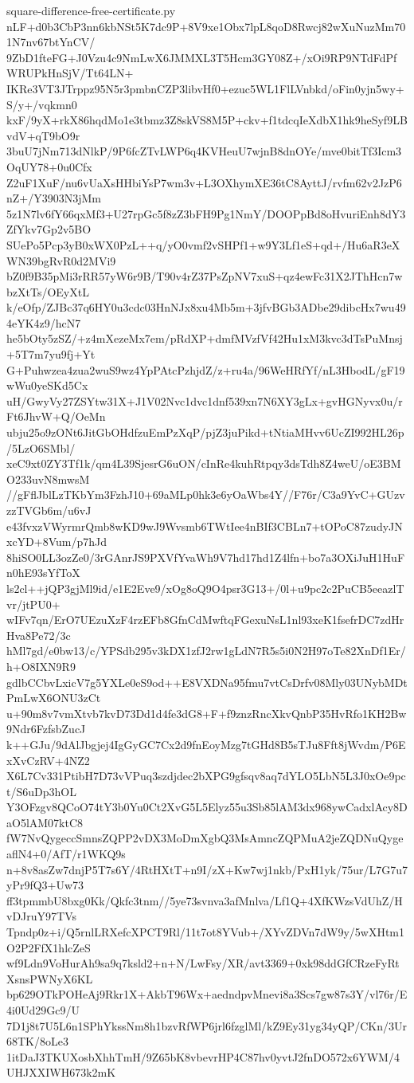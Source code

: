 \documentclass[11pt]{article}
\theoremstyle{definition}
\theoremstyle{remark}
\begin{document}
\begin{filecontents*}[overwrite]{square-difference-free-certificate.py}
nLF+d0b3CbP3nn6kbNSt5K7dc9P+8V9xe1Obx7lpL8qoD8Rwcj82wXuNuzMm701N7nv67btYnCV/
9ZbD1fteFG+J0Vzu4c9NmLwX6JMMXL3T5Hcm3GY08Z+/xOi9RP9NTdFdPfWRUPkHnSjV/Tt64LN+
IKRe3VT3JTrppz95N5r3pmbnCZP3libvHf0+ezuc5WL1FlLVnbkd/oFin0yjn5wy+S/y+/vqkmn0
kxF/9yX+rkX86hqdMo1e3tbmz3Z8skVS8M5P+ckv+f1tdcqIeXdbX1hk9heSyf9LBvdV+qT9bO9r
3buU7jNm713dNlkP/9P6fcZTvLWP6q4KVHeuU7wjnB8dnOYe/mve0bitTf3Icm3OqUY78+0u0Cfx
Z2uF1XuF/nu6vUaXsHHbiYsP7wm3v+L3OXhymXE36tC8AyttJ/rvfm62v2JzP6nZ+/Y3903N3jMm
5z1N7lv6fY66qxMf3+U27rpGc5f8zZ3bFH9Pg1NmY/DOOPpBd8oHvuriEnh8dY3ZfYkv7Gp2v5BO
SUePo5Pcp3yB0xWX0PzL++q/yO0vmf2vSHPf1+w9Y3Lf1eS+qd+/Hu6aR3eXWN39bgRvR0d2MVi9
bZ0f9B35pMi3rRR57yW6r9B/T90v4rZ37PsZpNV7xuS+qz4ewFc31X2JThHcn7wbzXtTs/OEyXtL
k/eOfp/ZJBc37q6HY0u3cdc03HnNJx8xu4Mb5m+3jfvBGb3ADbe29dibcHx7wu494eYK4z9/hcN7
he5bOty5zSZ/+z4mXezeMx7em/pRdXP+dmfMVzfVf42Hu1xM3kvc3dTsPuMnsj+5T7m7yu9fj+Yt
G+Puhwzea4zua2wuS9wz4YpPAtcPzhjdZ/z+ru4a/96WeHRfYf/nL3HbodL/gF19wWu0yeSKd5Cx
uH/GwyVy27ZSYtw31X+J1V02Nvc1dvc1dnf539xn7N6XY3gLx+gvHGNyvx0u/rFt6JhvW+Q/OeMn
ubju25o9zONt6JitGbOHdfzuEmPzXqP/pjZ3juPikd+tNtiaMHvv6UcZI992HL26p/5LzO6SMbl/
xeC9xt0ZY3Tf1k/qm4L39SjesrG6uON/cInRe4kuhRtpqy3dsTdh8Z4weU/oE3BMO233uvN8mwsM
//gFflJblLzTKbYm3FzhJ10+69aMLp0hk3e6yOaWbs4Y//F76r/C3a9YvC+GUzvzzTVGb6m/u6vJ
e43fvxzVWyrmrQmb8wKD9wJ9Wvsmb6TWtIee4nBIf3CBLn7+tOPoC87zudyJNxcYD+8Vum/p7hJd
8hiSO0LL3ozZe0/3rGAnrJS9PXVfYvaWh9V7hd17hd1Z4lfn+bo7a3OXiJuH1HuFn0hE93sYfToX
ls2cl++jQP3gjMl9id/e1E2Eve9/xOg8oQ9O4psr3G13+/0l+u9pc2c2PuCB5eeazlTvr/jtPU0+
wIFv7qn/ErO7UEzuXzF4rzEFb8GfnCdMwftqFGexuNsL1nl93xeK1fsefrDC7zdHrHva8Pe72/3c
hMl7gd/e0bw13/c/YPSdb295v3kDX1zfJ2rw1gLdN7R5s5i0N2H97oTe82XnDf1Er/h+O8IXN9R9
gdlbCCbvLxicV7g5YXLe0eS9od++E8VXDNa95fmu7vtCsDrfv08Mly03UNybMDtPmLwX6ONU3zCt
u+90m8v7vmXtvb7kvD73Dd1d4fe3dG8+F+f9znzRncXkvQnbP35HvRfo1KH2Bw9Ndr6FzfsbZucJ
k++GJu/9dAlJbgjej4IgGyGC7Cx2d9fnEoyMzg7tGHd8B5sTJu8Fft8jWvdm/P6ExXvCzRV+4NZ2
X6L7Cv331PtibH7D73vVPuq3szdjdec2bXPG9gfsqv8aq7dYLO5LbN5L3J0xOe9pct/S6uDp3hOL
Y3OFzgv8QCoO74tY3b0Yu0Ct2XvG5L5Elyz55u3Sb85lAM3dx968ywCadxlAcy8DaO5lAM07ktC8
fW7NvQygeccSmnsZQPP2vDX3MoDmXgbQ3MsAmncZQPMuA2jeZQDNuQygeaflN4+0/AfT/r1WKQ9s
n+8v8asZw7dnjP5T7s6Y/4RtHXtT+n9I/zX+Kw7wj1nkb/PxH1yk/75ur/L7G7u7yPr9fQ3+Uw73
ff3tpmmbU8bxg0Kk/Qkfc3tnm//5ye73svnva3afMnlva/Lf1Q+4XfKWzsVdUhZ/HvDJruY97TVs
Tpndp0z+i/Q5rnlLRXefcXPCT9Rl/11t7ot8YVub+/XYvZDVn7dW9y/5wXHtm1O2P2FfX1hlcZeS
wf9Ldn9VoHurAh9sa9q7ksld2+n+N/LwFsy/XR/avt3369+0xk98ddGfCRzeFyRtXsnsPWNyX6KL
bp629OTkPOHeAj9Rkr1X+AkbT96Wx+aedndpvMnevi8a3Scs7gw87s3Y/vl76r/E4i0Ud29Gc9/U
7D1j8t7U5L6n1SPhYkssNm8h1bzvRfWP6jrl6fzglMl/kZ9Ey31yg34yQP/CKn/3Ur68TK/8oLe3
1itDaJ3TKUXosbXhhTmH/9Z65bK8vbevrHP4C87hv0yvtJ2fnDO572x6YWM/4UHJXXIWH673k2mK

\end{filecontents*}
\end{document}
